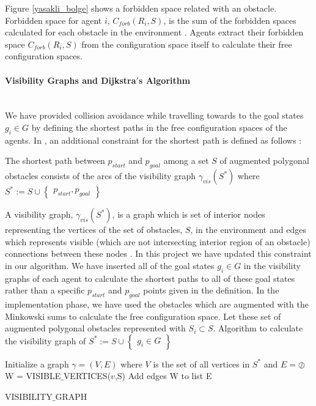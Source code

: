 Figure \ref{yasakli_bolge} shows a forbidden space related with an obstacle. Forbidden space for agent $i$, $C_{forb}(R_i, S)$, is the sum of the forbidden spaces calculated for each obstacle in the environment \cite{92}. Agents extract their forbidden space $C_{forb}(R_i, S)$ from the configuration space itself to calculate their free configuration spaces.
	
\paragraph{Visibility Graphs and Dijkstra$'$s Algorithm}\hspace{0pt} \\
We have provided collision avoidance while travelling towards to the goal states $g_i \in G$ by defining the shortest paths in the free configuration spaces of the agents. In \cite{92}, an additional constraint for the shortest path is defined as follows : 

\begin{displayquote}
The shortest path between $p_{start}$ and $p_{goal}$ among a set $S$ of augmented polygonal obstacles consists of the arcs of the visibility graph $\gamma_{vis}(S^*)$ where $S^* := S \cup \begin{Bmatrix}
p_{start}, p_{goal}
\end{Bmatrix}$
\end{displayquote}

A visibility graph, $\gamma_{vis}(S^*)$, is a graph which is set of interior nodes representing the vertices of the set of obstacles, $S$, in the environment and edges which represents visible (which are not intersecting interior region of an obstacle) connections between these nodes \cite{92}. In this project we have updated this constraint in our algorithm. We have inserted all of the goal states $g_i \in G$ in the visibility graphs of each agent to calculate the shortest paths to all of these goal states rather than a specific $p_{start}$ and $p_{goal}$ points given in the definition. In the implementation phase, we have used the obstacles which are augmented with the Minkowski sums to calculate the free configuration space. Let these set of augmented polygonal obstacles represented with $S_i \subset S$. Algorithm to calculate the visibility graph of  $S^* := S \cup \begin{Bmatrix}
g_i \in G
\end{Bmatrix}$
	
\begin{algorithm}[H]
Initialize a graph $\gamma = (V,E)$ where $V$ is the set of all vertices in $S^*$ and $E = \oslash$  \\
{		
W = VISIBLE$\_$VERTICES($v$,S)\;
Add edges W to list E\;
}\

\caption{VISIBILITY$\_$GRAPH}
\end{algorithm}

